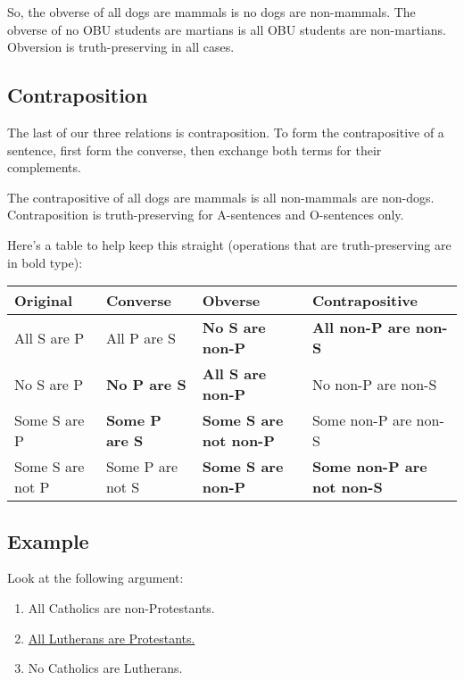 So, the obverse of all dogs are mammals is no dogs are non-mammals. The obverse of no OBU students are martians is all OBU students are non-martians. Obversion is truth-preserving in all cases.

\subsection{Contraposition}

The last of our three relations is contraposition. To form the contrapositive of a sentence, first form the converse, then exchange both terms for their complements.

The contrapositive of all dogs are mammals is all non-mammals are non-dogs. Contraposition is truth-preserving for A-sentences and O-sentences only.

\newpage

Here's a table to help keep this straight (operations that are truth-preserving are in bold type):


\begin{table}[]
\begin{tabular}{@{}llll@{}}
\toprule
Original         & Converse         & Obverse              & Contrapositive           \\ \midrule
All S are P      & All P are S      & \textbf{No S are non-P}       & \textbf{All non-P are non-S}      \\
No S are P       & \textbf{No P are S}       & \textbf{All S are non-P}      & No non-P are non-S       \\
Some S are P     & \textbf{Some P are S}     & \textbf{Some S are not non-P} & Some non-P are non-S     \\
Some S are not P & Some P are not S & \textbf{Some S are non-P}     & \textbf{Some non-P are not non-S} \\ \bottomrule
\end{tabular}
\end{table}

\subsection{Example}

Look at the following argument:

\begin{enumerate}
\item All Catholics are non-Protestants.
\item \underline{All Lutherans are Protestants.}
\item No Catholics are Lutherans.
\end{enumerate}

